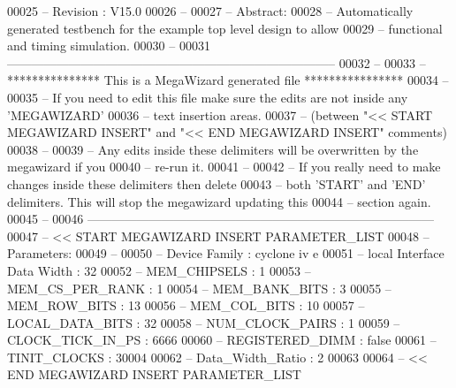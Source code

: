 \begin{DoxyCode}
00025 \textcolor{keyword}{-- Revision     : V15.0}
00026 \textcolor{keyword}{--}
00027 \textcolor{keyword}{-- Abstract:}
00028 \textcolor{keyword}{-- Automatically generated testbench for the example top level design to allow}
00029 \textcolor{keyword}{-- functional and timing simulation.}
00030 \textcolor{keyword}{--}
00031 \textcolor{keyword}{--------------------------------------------------------------------------------}
00032 \textcolor{keyword}{--}
00033 \textcolor{keyword}{-- *************** This is a MegaWizard generated file ****************}
00034 \textcolor{keyword}{--}
00035 \textcolor{keyword}{-- If you need to edit this file make sure the edits are not inside any 'MEGAWIZARD'}
00036 \textcolor{keyword}{-- text insertion areas.}
00037 \textcolor{keyword}{-- (between "<< START MEGAWIZARD INSERT" and "<< END MEGAWIZARD INSERT" comments)}
00038 \textcolor{keyword}{--}
00039 \textcolor{keyword}{-- Any edits inside these delimiters will be overwritten by the megawizard if you}
00040 \textcolor{keyword}{-- re-run it.}
00041 \textcolor{keyword}{--}
00042 \textcolor{keyword}{-- If you really need to make changes inside these delimiters then delete}
00043 \textcolor{keyword}{-- both 'START' and 'END' delimiters.  This will stop the megawizard updating this}
00044 \textcolor{keyword}{-- section again.}
00045 \textcolor{keyword}{--}
00046 \textcolor{keyword}{------------------------------------------------------------------------------------}
00047 \textcolor{keyword}{-- << START MEGAWIZARD INSERT PARAMETER\_LIST}
00048 \textcolor{keyword}{-- Parameters:}
00049 \textcolor{keyword}{--}
00050 \textcolor{keyword}{-- Device Family                      : cyclone iv e}
00051 \textcolor{keyword}{-- local Interface Data Width         : 32}
00052 \textcolor{keyword}{-- MEM\_CHIPSELS                       : 1}
00053 \textcolor{keyword}{-- MEM\_CS\_PER\_RANK                    : 1}
00054 \textcolor{keyword}{-- MEM\_BANK\_BITS                      : 3}
00055 \textcolor{keyword}{-- MEM\_ROW\_BITS                       : 13}
00056 \textcolor{keyword}{-- MEM\_COL\_BITS                       : 10}
00057 \textcolor{keyword}{-- LOCAL\_DATA\_BITS                    : 32}
00058 \textcolor{keyword}{-- NUM\_CLOCK\_PAIRS                    : 1}
00059 \textcolor{keyword}{-- CLOCK\_TICK\_IN\_PS                   : 6666}
00060 \textcolor{keyword}{-- REGISTERED\_DIMM                    : false}
00061 \textcolor{keyword}{-- TINIT\_CLOCKS                       : 30004}
00062 \textcolor{keyword}{-- Data\_Width\_Ratio                   : 2}
00063 
00064 \textcolor{keyword}{-- << END MEGAWIZARD INSERT PARAMETER\_LIST}

\end{DoxyCode}
